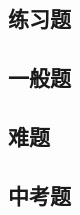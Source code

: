 \documentclass[12pt]{exam}
\begin{document}
\begin{Aquestions}
\newpage
\section{练习题}


\end{Aquestions}


\begin{Bquestions}
\newpage
\section{一般题}
\end{Bquestions}




\begin{Cquestions}
\newpage
\section{难题}
\end{Cquestions}



\begin{Dquestions}
\newpage
\section{中考题}
\end{Dquestions}




%
\end{document}
